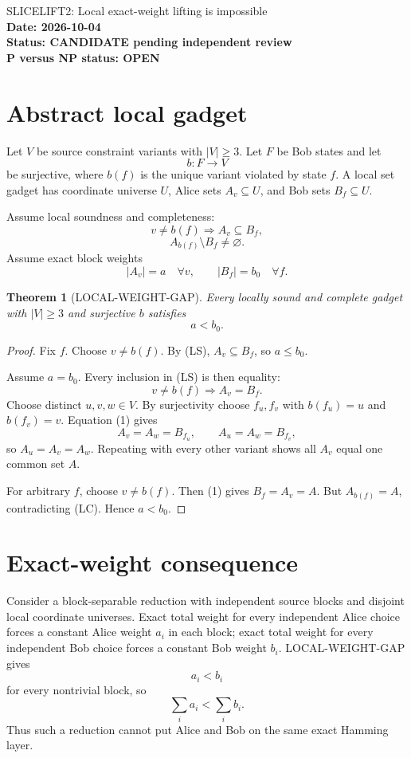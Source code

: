 \documentclass[11pt]{article}
\newtheorem{theorem}{Theorem}
\begin{document}
\begin{center}
{\Large SLICELIFT2: Local exact-weight lifting is impossible}\\[4pt]
\textbf{Date: 2026-10-04}\\
\textbf{Status: CANDIDATE pending independent review}\\
\textbf{P versus NP status: OPEN}
\end{center}

\section{Abstract local gadget}
Let \(V\) be source constraint variants with \(|V|\ge3\). Let \(F\) be Bob states and let
\[
b:F\to V
\]
be surjective, where \(b(f)\) is the unique variant violated by state \(f\).
A local set gadget has coordinate universe \(U\), Alice sets \(A_v\subseteq U\), and Bob sets \(B_f\subseteq U\).

Assume local soundness and completeness:
\[
v\ne b(f)\Longrightarrow A_v\subseteq B_f,
\tag{LS}
\]
\[
A_{b(f)}\setminus B_f\ne\varnothing.
\tag{LC}
\]
Assume exact block weights
\[
|A_v|=a\quad\forall v,\qquad |B_f|=b_0\quad\forall f.
\]

\begin{theorem}[LOCAL-WEIGHT-GAP]
Every locally sound and complete gadget with \(|V|\ge3\) and surjective \(b\) satisfies
\[
\boxed{a<b_0}.
\]
\end{theorem}

\begin{proof}
Fix \(f\). Choose \(v\ne b(f)\). By (LS), \(A_v\subseteq B_f\), so \(a\le b_0\).

Assume \(a=b_0\). Every inclusion in (LS) is then equality:
\[
v\ne b(f)\Longrightarrow A_v=B_f.
\tag{1}
\]
Choose distinct \(u,v,w\in V\). By surjectivity choose \(f_u,f_v\) with \(b(f_u)=u\) and \(b(f_v)=v\). Equation (1) gives
\[
A_v=A_w=B_{f_u},\qquad A_u=A_w=B_{f_v},
\]
so \(A_u=A_v=A_w\). Repeating with every other variant shows all \(A_v\) equal one common set \(A\).

For arbitrary \(f\), choose \(v\ne b(f)\). Then (1) gives \(B_f=A_v=A\). But \(A_{b(f)}=A\), contradicting (LC). Hence \(a<b_0\).
\end{proof}

\section{Exact-weight consequence}
Consider a block-separable reduction with independent source blocks and disjoint local coordinate universes. Exact total weight for every independent Alice choice forces a constant Alice weight \(a_i\) in each block; exact total weight for every independent Bob choice forces a constant Bob weight \(b_i\). LOCAL-WEIGHT-GAP gives
\[
a_i<b_i
\]
for every nontrivial block, so
\[
\sum_i a_i<\sum_i b_i.
\]
Thus such a reduction cannot put Alice and Bob on the same exact Hamming layer.
\end{document}
